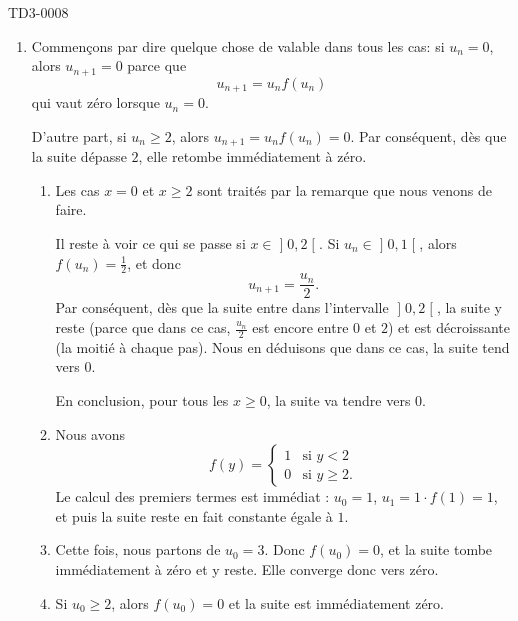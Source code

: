 
\begin{corrige}{TD3-0008}

	\begin{enumerate}
		\item
			Commençons par dire quelque chose de valable dans tous les cas: si $u_n=0$, alors $u_{n+1}=0$ parce que
			\begin{equation}
				u_{n+1}=u_nf(u_n)
			\end{equation}
			qui vaut zéro lorsque $u_n=0$.

			D'autre part, si $u_n\geq 2$, alors $u_{n+1}=u_nf(u_n)=0$. Par conséquent, dès que la suite dépasse $2$, elle retombe immédiatement à zéro.
			\begin{enumerate}
				\item
					Les cas $x=0$ et $x\geq 2$ sont traités par la remarque que nous venons de faire.

			Il reste à voir ce qui se passe si $x\in\mathopen] 0 , 2 \mathclose[$. Si $u_n\in\mathopen] 0 , 1 \mathclose[$, alors $f(u_n)=\frac{ 1 }{2}$, et donc
			\begin{equation}
				u_{n+1}=\frac{ u_n }{ 2 }.
			\end{equation}
			Par conséquent, dès que la suite entre dans l'intervalle $\mathopen] 0 , 2 \mathclose[$, la suite y reste (parce que dans ce cas, $\frac{ u_n }{2}$ est encore entre $0$ et $2$) et est décroissante (la moitié à chaque pas). Nous en déduisons que dans ce cas, la suite tend vers $0$.

			En conclusion, pour tous les $x\geq 0$, la suite va tendre vers $0$.

				\item
					Nous avons
					\begin{equation}
						f(y)=\begin{cases}
							1	&	\text{si $y<2$}\\
							0	&	 \text{si $y\geq 2$.}
						\end{cases}
					\end{equation}
					Le calcul des premiers termes est immédiat : $u_0=1$, $u_1=1\cdot f(1)=1$, et puis la suite reste en fait constante égale à $1$.
				\item
					Cette fois, nous partons de $u_0=3$. Donc $f(u_0)=0$, et la suite tombe immédiatement à zéro et y reste. Elle converge donc vers zéro.
				\item
					Si $u_0\geq 2$, alors $f(u_0)=0$ et la suite est immédiatement zéro.


\end{enumerate}
\end{enumerate}
\end{corrige}
